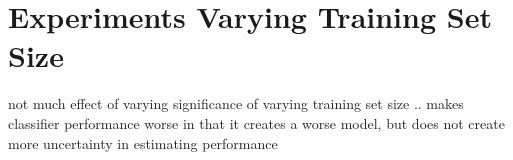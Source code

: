 \section{Experiments Varying Training Set Size}

not much effect of varying significance of varying training
set size .. makes classifier performance worse in that it 
creates a worse model, but does not create more uncertainty
in estimating performance 